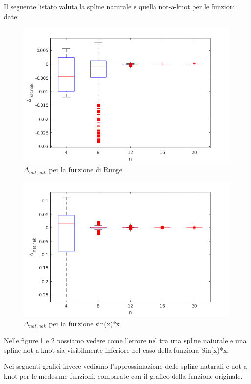  Il seguente listato valuta la spline naturale e quella not-a-knot per le funzioni date:
\bnb

\enb
\begin{figure}
\centering
\includegraphics[scale=0.7]{cap_4/es5/errors}
\caption{$\Delta_{nat, nak}$ per la funzione di Runge}
\label{err_runge}
\end{figure}
\begin{figure}
\centering
\includegraphics[scale=0.5]{cap_4/es5/errors_sin}
\caption{$\Delta_{nat, nak}$ per la funzione sin(x)*x}
\label{err_sin}
\end{figure}
Nelle figure \ref{err_runge} e \ref{err_sin} possiamo vedere come l'errore nel tra una spline naturale e una spline not a knot sia visibilmente inferiore nel caso della funziona Sin(x)*x.

Nei seguenti grafici invece vediamo l'approssimazione delle spline naturali e not a knot per le medesime funzioni, comparate con il grafico della funzione originale.


